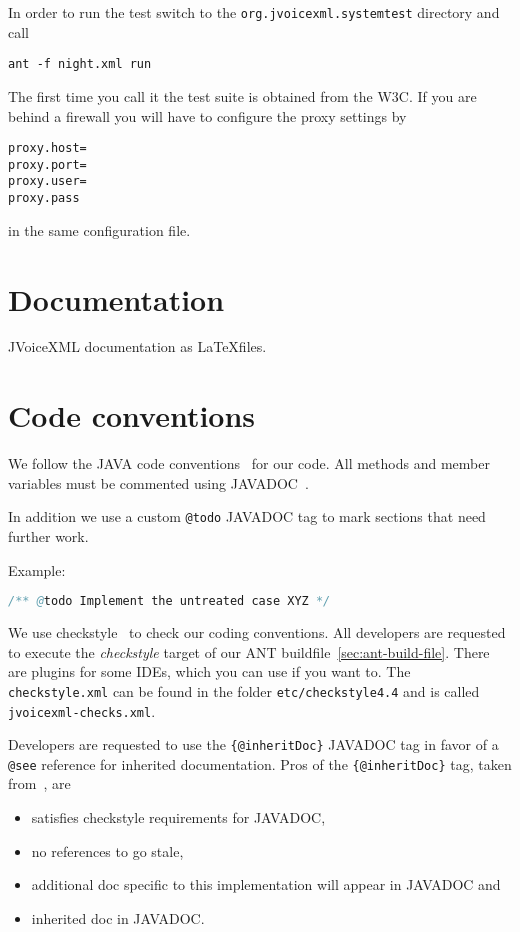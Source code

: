 \documentclass[11pt,a4paper]{article}
\begin{document}
In order to run the test switch to the \lstinline{org.jvoicexml.systemtest}
directory and call
\begin{lstlisting}
ant -f night.xml run
\end{lstlisting}

The first time you call it the test suite is obtained from the W3C. If you are
behind a firewall you will have to configure the proxy settings by
\begin{lstlisting}
proxy.host=
proxy.port=
proxy.user=
proxy.pass
\end{lstlisting}
in the same configuration file.

\section{Documentation}

JVoiceXML documentation as \LaTeX files.

\section{Code conventions}
\label{sec:code-conventions}

We follow the JAVA code conventions~\cite{sun:codeconv} for our code. All
methods and member variables must be commented using 
JAVADOC~\cite{sun:javadoc_guidelines}.

In addition we use a custom \texttt{@todo} JAVADOC tag to mark
sections that need further work.

Example:

\begin{lstlisting}[language=Java]
/** @todo Implement the untreated case XYZ */
\end{lstlisting}

We use checkstyle~\cite{checkstyle} to check our coding conventions.
All developers are requested to execute the \emph{checkstyle} target
of our ANT buildfile~\ref{sec:ant-build-file}. 
There are plugins for some IDEs, which you can use if you want to. The
\texttt{checkstyle.xml} can be found in the folder 
\texttt{etc/checkstyle4.4} and is called \texttt{jvoicexml-checks.xml}.

Developers are requested to use the \texttt{\{@inheritDoc\}} JAVADOC
tag in favor of a \texttt{@see} reference for inherited documentation.
Pros of the \texttt{\{@inhe\-rit\-Doc\}} tag, taken 
from~\cite{tauber:inheritdoc}, are
\begin{itemize}
\item satisfies checkstyle requirements for JAVADOC,
\item no references to go stale,
\item additional doc specific to this implementation will appear in JAVADOC and
\item inherited doc in JAVADOC.
\end{itemize}
\end{document}

